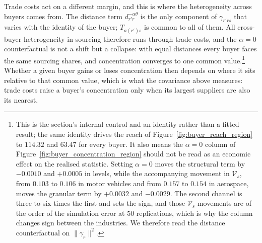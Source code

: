 Trade costs act on a different margin, and this is where the heterogeneity across buyers comes from. The distance term $d_{r'r}^{-\alpha\theta}$ is the only component of $\gamma_{r'rs}$ that varies with the identity of the buyer; $T_{a(r')s}$ is common to all of them. All cross-buyer heterogeneity in sourcing therefore runs through trade costs, and the $\alpha=0$ counterfactual is not a shift but a collapse: with equal distances every buyer faces the same sourcing shares, and concentration converges to one common value.\footnote{This is the section's internal control and an identity rather than a fitted result; the same identity drives the reach of Figure~\ref{fig:buyer_reach_region} to $114.32$ and $63.47$ for every buyer. It also means the $\alpha=0$ column of Figure~\ref{fig:buyer_concentration_region} should not be read as an economic effect on the realised statistic. Setting $\alpha=0$ moves the structural term by $-0.0010$ and $+0.0005$ in levels, while the accompanying movement in $\mathcal{V}_{s}$, from $0.103$ to $0.106$ in motor vehicles and from $0.157$ to $0.154$ in aerospace, moves the granular term by $+0.0032$ and $-0.0029$. The second channel is three to six times the first and sets the sign, and those $\mathcal{V}_{s}$ movements are of the order of the simulation error at $50$ replications, which is why the column changes sign between the industries. We therefore read the distance counterfactual on $\|\gamma_{r}\|^{2}$.} Whether a given buyer gains or loses concentration then depends on where it sits relative to that common value, which is what the covariance above measures: trade costs raise a buyer's concentration only when its largest suppliers are also its nearest.

